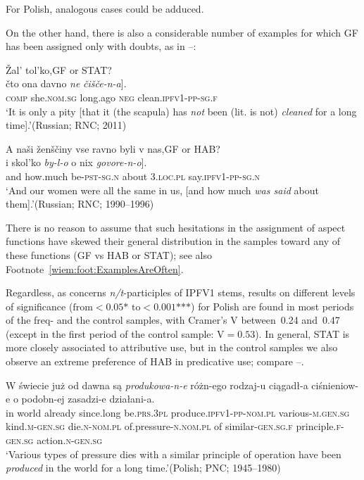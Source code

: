 \documentclass[output=paper]{langscibook}
\begin{document}
\noindent For Polish, analogous cases could be adduced.

On the other hand, there is also a considerable number of examples for which GF has been assigned only with doubts, as in --:

\ea\label{wiem:ex:notcleaned}{{Žal’ tol’ko,}\hfill GF or STAT?\\ 
\gll \minsp{[} {čto} {ona} {davno} {\textit{ne}} {\textit{čišče-n-a}}].\\
{} \textsc{comp} she.\textsc{nom.sg} long.ago \textsc{neg} clean.\textsc{ipfv1-pp-sg.f}\\
\glt ‘It is only a pity [that it (the scapula) has \textit{not} been (lit. is not) \textit{cleaned} for a long time].’\hfill (Russian; RNC; 2011)
}
\z

\ea\label{wiem:ex:said}{{A naši ženščiny vse ravno byli v nas,}\hfill GF or HAB?\\
\gll \minsp{[} {i} {skol’ko} {\textit{by-l-o}} {o} {nix} {\textit{govore-n-o}}].\\
{} and how.much be-\textsc{pst-sg.n} about \textsc{3.loc.pl} say.\textsc{ipfv1-pp-sg.n}\\
\glt ‘And our women were all the same in us, [and how much \textit{was said} about them].’\hfill (Russian; RNC; 1990--1996)
}
\z

\noindent There is no reason to assume that such hesitations in the assignment of aspect functions have skewed their general distribution in the samples toward any of these functions (GF vs HAB or STAT); see also Footnote~\ref{wiem:foot:ExamplesAreOften}.

Regardless, as concerns \textit{n/t}-participles of IPFV1 stems, results on different levels of significance ($\text{from}{}<0.05\text{*~to}{}<0.001\text{***}$) for Polish are found in most periods of the freq- and the control samples, with Cramer’s V between~0.24 and~0.47 (except in the first period of the control sample: $\text{V}=0.53$). In general, STAT is more closely associated to attributive use, but in the control samples we also observe an extreme preference of HAB in predicative use; compare --.

\ea\label{wiem:ex:produced}{\gll
{W} {świecie} {już} {od dawna} {są} {\textit{produkowa-n-e}} {różn-ego} {rodzaj-u} {ciągadł-a} {ciśnieniow-e} {o} {podobn-ej} {zasadzi-e} {działani-a.}\\
in world already since.long be.\textsc{prs.3pl} produce.\textsc{ipfv1-pp-nom.pl} various-\textsc{m.gen.sg} kind.\textsc{m-gen.sg} die.\textsc{n-nom.pl} of.pressure-\textsc{n.nom.pl} of similar-\textsc{gen.sg.f} principle.\textsc{f-gen.sg} action.\textsc{n-gen.sg}\\
\glt ‘Various types of pressure dies with a similar principle of operation have been \textit{produced} in the world for a long time.’\hfill (Polish; PNC; 1945--1980)
}
\z
\end{document}
